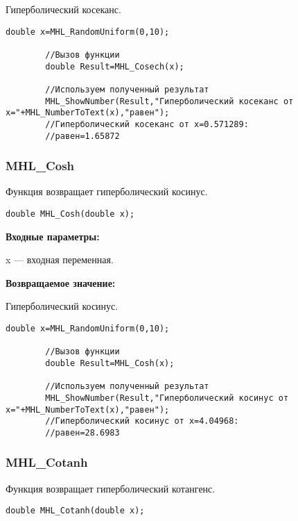 \documentclass[a4paper,12pt]{article}
\begin{document}
Гиперболический косеканс.


\begin{lstlisting}[label=code_use_MHL_Cosech,caption=Пример использования]
        double x=MHL_RandomUniform(0,10);

        //Вызов функции
        double Result=MHL_Cosech(x);

        //Используем полученный результат
        MHL_ShowNumber(Result,"Гиперболический косеканс от x="+MHL_NumberToText(x),"равен");
        //Гиперболический косеканс от x=0.571289:
        //равен=1.65872
\end{lstlisting}

\subsubsection{MHL\_Cosh}\label{MHL_Cosh}

Функция возвращает гиперболический косинус.


\begin{lstlisting}[label=code_syntax_MHL_Cosh,caption=Синтаксис]
double MHL_Cosh(double x);
\end{lstlisting}

\textbf{Входные параметры:}

 x --- входная переменная.

\textbf{Возвращаемое значение:}

Гиперболический косинус.


\begin{lstlisting}[label=code_use_MHL_Cosh,caption=Пример использования]
        double x=MHL_RandomUniform(0,10);

        //Вызов функции
        double Result=MHL_Cosh(x);

        //Используем полученный результат
        MHL_ShowNumber(Result,"Гиперболический косинус от x="+MHL_NumberToText(x),"равен");
        //Гиперболический косинус от x=4.04968:
        //равен=28.6983
\end{lstlisting}

\subsubsection{MHL\_Cotanh}\label{MHL_Cotanh}

Функция возвращает гиперболический котангенс.


\begin{lstlisting}[label=code_syntax_MHL_Cotanh,caption=Синтаксис]
double MHL_Cotanh(double x);
\end{lstlisting}
\end{document}
